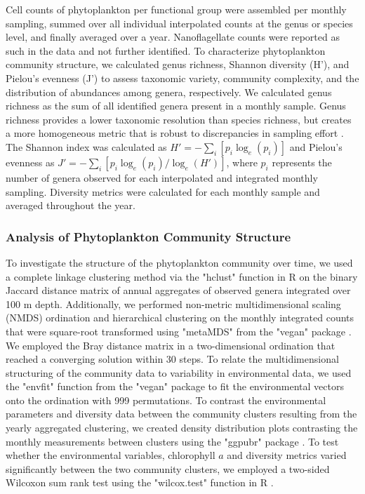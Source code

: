 \documentclass[draft]{agujournal2019}
\begin{document}
    Cell counts of phytoplankton per functional group were assembled per monthly sampling, summed over all individual interpolated counts at the genus or species level, and finally averaged over a year. Nanoflagellate counts were reported as such in the data and not further identified. To characterize phytoplankton community structure, we calculated genus richness, Shannon diversity (H'), and Pielou’s evenness (J') to assess taxonomic variety, community complexity, and the distribution of abundances among genera, respectively. We calculated genus richness as the sum of all identified genera present in a monthly sample. Genus richness provides a lower taxonomic resolution than species richness, but creates a more homogeneous metric that is robust to discrepancies in sampling effort \cite{ptacnik_diversity_2008, de2020higher}. The Shannon index was calculated as $H' = -\sum_i [p_i \log_{e}(p_i)]$ and Pielou's evenness as $J' = -\sum_i[ p_i \log_{e}( p_i )/\log_{e}(H')]$, where $p_i$ represents the number of genera observed for each interpolated and integrated monthly sampling. Diversity metrics were calculated for each monthly sample and averaged throughout the year. 

      
    \subsubsection{Analysis of Phytoplankton Community Structure}
    To investigate the structure of the phytoplankton community over time, we used a complete linkage clustering method via the "hclust" function in R \cite{r_core_team_r_2024} on the binary Jaccard distance matrix of annual aggregates of observed genera integrated over 100 m depth. 
    Additionally, we performed non-metric multidimensional scaling (NMDS) ordination and hierarchical clustering on the monthly integrated counts that were square-root transformed using "metaMDS" from the "vegan" package \cite{oksanen_vegan_2024}. We employed the Bray distance matrix in a two-dimensional ordination that reached a converging solution within 30 steps. To relate the multidimensional structuring of the community data to variability in environmental data, we used the "envfit" function from the "vegan" package to fit the environmental vectors onto the ordination with 999 permutations. 
    To contrast the environmental parameters and diversity data between the community clusters resulting from the yearly aggregated clustering, we created density distribution plots contrasting the monthly measurements between clusters using the "ggpubr" package \cite{kassambara_ggpubr_2023}. To test whether the environmental variables, chlorophyll $a$ and diversity metrics varied significantly between the two community clusters, we employed a two-sided Wilcoxon sum rank test using the "wilcox.test" function in R \cite{r_core_team_r_2024}.
\end{document}
